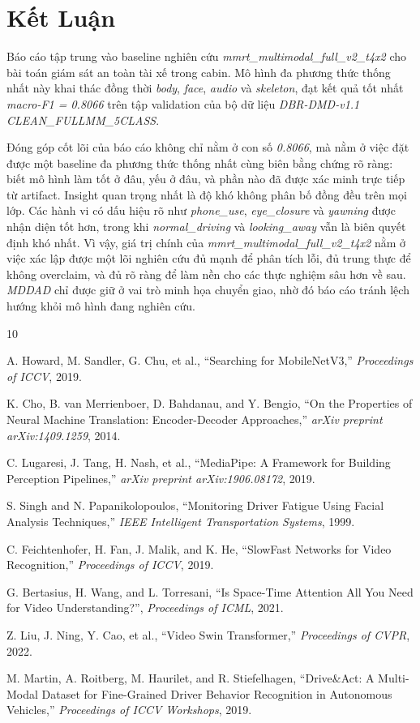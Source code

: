 \documentclass[conference,a4paper]{IEEEtran}
\begin{document}
\balance
\section[Ket Luan]{Kết Luận}
Báo cáo tập trung vào baseline nghiên cứu \textit{mmrt\_multimodal\_full\_v2\_t4x2} cho bài toán giám sát an toàn tài xế trong cabin. Mô hình đa phương thức thống nhất này khai thác đồng thời \textit{body}, \textit{face}, \textit{audio} và \textit{skeleton}, đạt kết quả tốt nhất \textit{macro-F1 = 0.8066} trên tập validation của bộ dữ liệu \textit{DBR-DMD-v1.1 CLEAN\_FULLMM\_5CLASS}. 

Đóng góp cốt lõi của báo cáo không chỉ nằm ở con số \textit{0.8066}, mà nằm ở việc đặt được một baseline đa phương thức thống nhất cùng biên bằng chứng rõ ràng: biết mô hình làm tốt ở đâu, yếu ở đâu, và phần nào đã được xác minh trực tiếp từ artifact. Insight quan trọng nhất là độ khó không phân bố đồng đều trên mọi lớp. Các hành vi có dấu hiệu rõ như \textit{phone\_use}, \textit{eye\_closure} và \textit{yawning} được nhận diện tốt hơn, trong khi \textit{normal\_driving} và \textit{looking\_away} vẫn là biên quyết định khó nhất. Vì vậy, giá trị chính của \textit{mmrt\_multimodal\_full\_v2\_t4x2} nằm ở việc xác lập được một lõi nghiên cứu đủ mạnh để phân tích lỗi, đủ trung thực để không overclaim, và đủ rõ ràng để làm nền cho các thực nghiệm sâu hơn về sau. \textit{MDDAD} chỉ được giữ ở vai trò minh họa chuyển giao, nhờ đó báo cáo tránh lệch hướng khỏi mô hình đang nghiên cứu.

\begin{thebibliography}{10}
\small

A. Howard, M. Sandler, G. Chu, et al.,
``Searching for MobileNetV3,''
\textit{Proceedings of ICCV}, 2019.

K. Cho, B. van Merrienboer, D. Bahdanau, and Y. Bengio,
``On the Properties of Neural Machine Translation: Encoder-Decoder Approaches,''
\textit{arXiv preprint arXiv:1409.1259}, 2014.

C. Lugaresi, J. Tang, H. Nash, et al.,
``MediaPipe: A Framework for Building Perception Pipelines,''
\textit{arXiv preprint arXiv:1906.08172}, 2019.

S. Singh and N. Papanikolopoulos,
``Monitoring Driver Fatigue Using Facial Analysis Techniques,''
\textit{IEEE Intelligent Transportation Systems}, 1999.

C. Feichtenhofer, H. Fan, J. Malik, and K. He,
``SlowFast Networks for Video Recognition,''
\textit{Proceedings of ICCV}, 2019.

G. Bertasius, H. Wang, and L. Torresani,
``Is Space-Time Attention All You Need for Video Understanding?'',
\textit{Proceedings of ICML}, 2021.

Z. Liu, J. Ning, Y. Cao, et al.,
``Video Swin Transformer,''
\textit{Proceedings of CVPR}, 2022.

M. Martin, A. Roitberg, M. Haurilet, and R. Stiefelhagen,
``Drive\&Act: A Multi-Modal Dataset for Fine-Grained Driver Behavior Recognition in Autonomous Vehicles,''
\textit{Proceedings of ICCV Workshops}, 2019.

\end{thebibliography}
\end{document}
